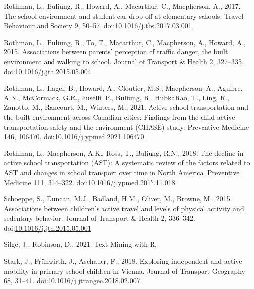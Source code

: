 \documentclass[]{elsarticle} %
\begin{document}
\leavevmode\hypertarget{ref-rothmanSchoolEnvironmentStudent2017}{}%
Rothman, L., Buliung, R., Howard, A., Macarthur, C., Macpherson, A.,
2017. The school environment and student car drop-off at elementary
schools. Travel Behaviour and Society 9, 50--57.
doi:\href{https://doi.org/10.1016/j.tbs.2017.03.001}{10.1016/j.tbs.2017.03.001}

\leavevmode\hypertarget{ref-rothmanAssociationsParentsPerception2015}{}%
Rothman, L., Buliung, R., To, T., Macarthur, C., Macpherson, A., Howard,
A., 2015. Associations between parents' perception of traffic danger,
the built environment and walking to school. Journal of Transport \&
Health 2, 327--335.
doi:\href{https://doi.org/10.1016/j.jth.2015.05.004}{10.1016/j.jth.2015.05.004}

\leavevmode\hypertarget{ref-rothmanActiveSchoolTransportation2021}{}%
Rothman, L., Hagel, B., Howard, A., Cloutier, M.S., Macpherson, A.,
Aguirre, A.N., McCormack, G.R., Fuselli, P., Buliung, R., HubkaRao, T.,
Ling, R., Zanotto, M., Rancourt, M., Winters, M., 2021. Active school
transportation and the built environment across Canadian cities:
Findings from the child active transportation safety and the environment
(CHASE) study. Preventive Medicine 146, 106470.
doi:\href{https://doi.org/10.1016/j.ypmed.2021.106470}{10.1016/j.ypmed.2021.106470}

\leavevmode\hypertarget{ref-rothmanDeclineActiveSchool2018}{}%
Rothman, L., Macpherson, A.K., Ross, T., Buliung, R.N., 2018. The
decline in active school transportation (AST): A systematic review of
the factors related to AST and changes in school transport over time in
North America. Preventive Medicine 111, 314--322.
doi:\href{https://doi.org/10.1016/j.ypmed.2017.11.018}{10.1016/j.ypmed.2017.11.018}

\leavevmode\hypertarget{ref-schoeppeAssociationsChildrenActive2015}{}%
Schoeppe, S., Duncan, M.J., Badland, H.M., Oliver, M., Browne, M., 2015.
Associations between children's active travel and levels of physical
activity and sedentary behavior. Journal of Transport \& Health 2,
336--342.
doi:\href{https://doi.org/10.1016/j.jth.2015.05.001}{10.1016/j.jth.2015.05.001}

\leavevmode\hypertarget{ref-silgeTextMining2021}{}%
Silge, J., Robinson, D., 2021. Text Mining with R.

\leavevmode\hypertarget{ref-starkExploringIndependentActive2018}{}%
Stark, J., Frühwirth, J., Aschauer, F., 2018. Exploring independent and
active mobility in primary school children in Vienna. Journal of
Transport Geography 68, 31--41.
doi:\href{https://doi.org/10.1016/j.jtrangeo.2018.02.007}{10.1016/j.jtrangeo.2018.02.007}
\end{document}
